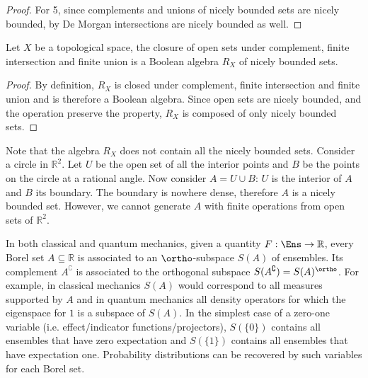 \begin{mathSection}
\begin{proof}
		For 5, since complements and unions of nicely bounded sets are nicely bounded, by De Morgan intersections are nicely bounded as well.
	\end{proof}
	
	\begin{prop}
		Let $X$ be a topological space, the closure of open sets under complement, finite intersection and finite union is a Boolean algebra $R_X$ of nicely bounded sets.
	\end{prop}
	
	\begin{proof}
		By definition, $R_X$ is closed under complement, finite intersection and finite union and is therefore a Boolean algebra. Since open sets are nicely bounded, and the operation preserve the property, $R_X$ is composed of only nicely bounded sets.
	\end{proof}
	
	\begin{remark}
		Note that the algebra $R_X$ does not contain all the nicely bounded sets. Consider a circle in $\mathbb{R}^2$. Let $U$ be the open set of all the interior points and $B$ be the points on the circle at a rational angle. Now consider $A = U \cup B$: $U$ is the interior of $A$ and $B$ its boundary. The boundary is nowhere dense, therefore $A$ is a nicely bounded set. However, we cannot generate $A$ with finite operations from open sets of $\mathbb{R}^2$.
	\end{remark}
\end{mathSection}



In both classical and quantum mechanics, given a quantity $F : \Ens \to \mathbb{R}$, every Borel set $A \subseteq \mathbb{R}$ is associated to an $\ortho$-subspace $S(A)$ of ensembles. Its complement $A^{\complement}$ is associated to the orthogonal subspace $S(A^{\complement}) = S(A)^\ortho$. For example, in classical mechanics $S(A)$ would correspond to all measures supported by $A$ and in quantum mechanics all density operators for which the eigenspace for $1$ is a subspace of $S(A)$. In the simplest case of a zero-one variable (i.e. effect/indicator functions/projectors), $S(\{0\})$ contains all ensembles that have zero expectation and $S(\{1\})$ contains all ensembles that have expectation one. Probability distributions can be recovered by such variables for each Borel set.

